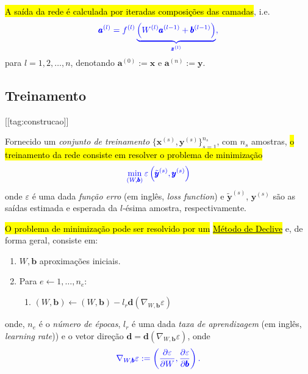 \hl{A saída da rede é calculada por iteradas composições das camadas}, i.e.
\begin{equation}\color{blue}\pmb{a}^{(l)} = f^{(l)}\underbrace{\left(W^{(l)}\pmb{a}^{(l-1)} + \pmb{b}^{(l-1)}\right)}_{\pmb{z}^{(l)}},
\end{equation}
para $l= 1, 2, \dotsc, n$, denotando $\pmb{a}^{(0)} := \pmb{x}$ e $\pmb{a}^{(n)} := \pmb{y}$.

\subsection{Treinamento}\label{cap_mlp_sec_modelo:ssec:treinamento}
[[tag:construcao]]

Fornecido um \emph{conjunto de treinamento} $\{\pmb{x}^{(s)}, \pmb{y}^{(s)}\}_{s=1}^{n_s}$, com $n_s$ amostras, \hl{o treinamento da rede consiste em resolver o problema de minimização}
\begin{equation}\color{blue}\min_{(W,\pmb{b})}\varepsilon\left(\tilde{\pmb{y}}^{(s)}, \pmb{y}^{(s)}\right)
\end{equation}
onde $\varepsilon$ é uma dada \emph{função erro} (em inglês, \textit{loss function}) e $\tilde{\pmb{y}}^{(s)}$, $\pmb{y}^{(s)}$ são as saídas estimada e esperada da $l$-ésima amostra, respectivamente.

\hl{O problema de minimização pode ser resolvido por um }\href{https://notaspedrok.com.br/notas/MatematicaNumericaAvancada/cap\_otimizacao_sec_minimi.html}{\hl{Método de Declive}} e, de forma geral, consiste em:
\begin{enumerate}
\item $W, \pmb{b}$ aproximações iniciais.
\item Para $e\leftarrow 1, \dotsc, n_e$:
  \begin{enumerate}\hleq
  \item $\displaystyle (W, \pmb{b}) \leftarrow (W, \pmb{b}) - l_r\pmb{d}\left(\nabla_{W,\pmb{b}} \varepsilon\right)$
  \end{enumerate}
\end{enumerate}
onde, $n_e$ é o \emph{número de épocas}, $l_r$ é uma dada \emph{taxa de aprendizagem} (em inglês, \textit{learning rate})) e o vetor direção $\pmb{d} = \pmb{d}\left(\nabla_{W,\pmb{b}} \varepsilon\right)$, onde
\begin{equation}\color{blue}\nabla_{W,\pmb{b}} \varepsilon := \left(\frac{\partial\varepsilon}{\partial W}, \frac{\partial\varepsilon}{\partial\pmb{b}}\right).
\end{equation}

